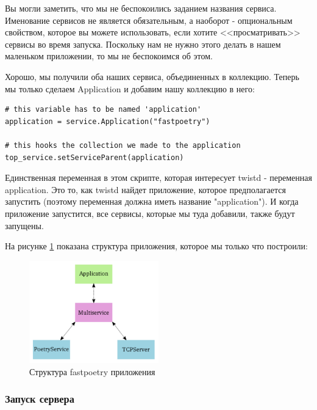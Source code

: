 Вы могли заметить, что мы не беспокоились заданием 
названия сервиса. Именование сервисов не является 
обязательным, а наоборот - опциональным свойством, 
которое вы можете использовать, если хотите 
<<просматривать>> сервисы во время запуска. Поскольку 
нам не нужно этого делать в нашем маленьком приложении, 
то мы не беспокоимся об этом.


Хорошо, мы получили оба наших сервиса, объединенных 
в коллекцию. Теперь мы только сделаем Application и 
добавим нашу коллекцию в него:

\begin{scriptsize}\begin{verbatim}
# this variable has to be named 'application'
application = service.Application("fastpoetry")

# this hooks the collection we made to the application
top_service.setServiceParent(application)
\end{verbatim}\end{scriptsize}


Единственная переменная в этом скрипте, которая 
интересует twistd - переменная application. Это то, как 
twistd найдет приложение, которое предполагается запустить (поэтому 
переменная должна иметь название "application"). И когда 
приложение запустится, все сервисы, которые мы туда добавили, 
также будут запущены.


На рисунке \ref{fig:application} показана структура приложения, 
которое мы только что построили:

\begin{figure}[h]
\begin{center}
    \includegraphics[width=0.5\textwidth]{images/application.pdf}
    \caption{Структура fastpoetry приложения\label{fig:application}}
\end{center}
\end{figure}


\subsubsection{Запуск сервера}


